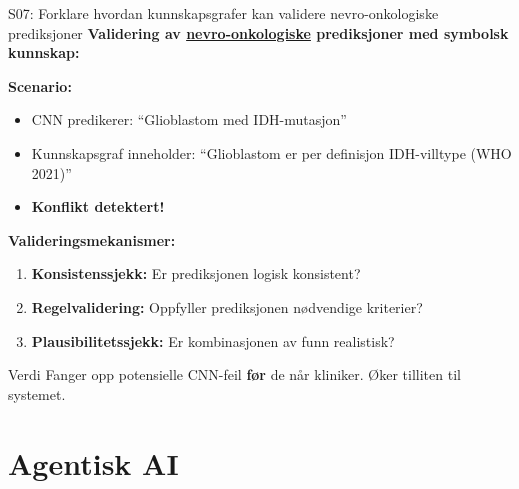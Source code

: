 \documentclass[aspectratio=169, 10pt]{beamer}
\begin{document}
\begin{frame}{S07: Forklare hvordan kunnskapsgrafer kan validere nevro-onkologiske prediksjoner}
    \textbf{Validering av \href{https://en.wikipedia.org/wiki/Neuro-oncology}{nevro-onkologiske} prediksjoner med symbolsk kunnskap:}
    
    \vspace{0.2cm}
    \textbf{Scenario:}
    \begin{itemize}
        \item CNN predikerer: ``Glioblastom med IDH-mutasjon''
        \item Kunnskapsgraf inneholder: ``Glioblastom er per definisjon IDH-villtype (WHO 2021)''
        \item \textbf{Konflikt detektert!}
    \end{itemize}
    
    \vspace{0.15cm}
    \textbf{Valideringsmekanismer:}
    \begin{enumerate}
        \item \textbf{Konsistenssjekk:} Er prediksjonen logisk konsistent?
        \item \textbf{Regelvalidering:} Oppfyller prediksjonen nødvendige kriterier?
        \item \textbf{Plausibilitetssjekk:} Er kombinasjonen av funn realistisk?
    \end{enumerate}
    
    {\small
    \begin{alertblock}{Verdi}
        Fanger opp potensielle CNN-feil \textbf{før} de når kliniker. Øker tilliten til systemet.
    \end{alertblock}
    }
\end{frame}

\section{Agentisk AI}
\end{document}
